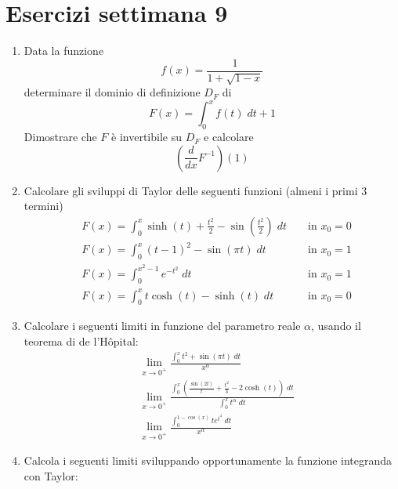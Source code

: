 \section{Esercizi settimana 9}
\begin{enumerate}
	\item Data la funzione
	      \[
		      f\left(x\right) = \frac{1}{1 + \sqrt{1-x}}
	      \]
	      determinare il dominio di definizione $ D_F $ di
	      \[
		      F\left(x\right) = \int_{0}^{x} f\left(t\right) \; dt + 1
	      \]
	      Dimostrare che $ F $  è invertibile su $ D_F $ e calcolare
	      \[
		      \left(\frac{d}{dx} F ^{-1}\right)\left(1\right)
	      \]
	\item Calcolare gli sviluppi di Taylor delle seguenti funzioni (almeni i primi 3 termini)
	      \begin{align*}
		       & F\left(x\right) = \int_{0}^{x}  \sinh \left(t\right) + \frac{t^2 }{2} - \sin \left(\frac{t^2 }{2}\right) \; dt &  & \text{ in } x_0 = 0 \\
		       & F\left(x\right) = \int_{0}^{x}  \left(t-1\right)^2  - \sin \left(\pi  t\right) \; dt                           &  & \text{ in } x_0 = 1 \\
		       & F\left(x\right) = \int_{0}^{x^2  -1} e^{-t^2 } \; dt                                                           &  & \text{ in } x_0 = 1 \\
		       & F\left(x\right) = \int_{0}^{x} t \cosh \left(t\right) - \sinh \left(t\right) \; dt                             &  & \text{ in } x_0 = 0
	      \end{align*}
	\item Calcolare i seguenti limiti in funzione del parametro reale $ \alpha  $, usando il teorema di de l'Hôpital:
	      \begin{align*}
		       & \lim_{x \to 0^{+}} \frac{\int_{0}^{x} t^2 + \sin \left(\pi t\right) \; dt}{x^{\alpha }}                                                                             \\
		       & \lim_{x \to 0^{+}} \frac{\int_{0}^{x} \left(\frac{\sin \left(2t \right)}{t} + \frac{t^2 }{3} - 2 \cosh\left(t\right)\right) \; dt}{\int_{0}^{x} t ^{\alpha } \; dt} \\
		       & \lim_{x \to 0^{+}} \frac{\int_{0}^{1-\cos \left(x\right)} te^{t ^{4}} \; dt}{x^{\alpha }}
	      \end{align*}
	\item Calcola i seguenti limiti sviluppando opportunamente la funzione integranda con Taylor:
	      \begin{align*}

\end{align*}
\end{enumerate}
